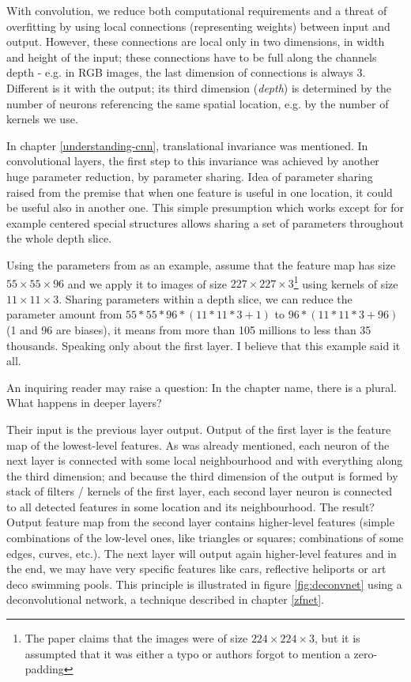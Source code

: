 With convolution, we reduce both computational requirements and a threat of 
overfitting by using local connections (representing weights) between input and 
output. However, these connections are local only in two dimensions, in width 
and height of the input; these connections have to be full along the channels 
depth - e.g. in RGB images, the last dimension of connections is always 3. 
Different is it with the output; its third dimension (\textit{depth}) is 
determined by the number of neurons referencing the same spatial location, e.g. 
by the number of kernels we use. 

In chapter \ref{understanding-cnn}, translational invariance was mentioned. In 
convolutional layers, the first step to this invariance was achieved by another 
huge parameter reduction, by parameter sharing. Idea of parameter sharing raised 
from the premise that when one feature is useful in one location, it could be 
useful also in another one. This simple presumption which works except for for 
example centered special structures allows sharing a set of parameters 
throughout the whole depth slice. 

Using the parameters from \cite{cnn-classification} as an example, assume that 
the feature map has size $55 \times 55 \times 96$ and we apply it to images of 
size $227 \times 227 \times 3$\footnote{The paper claims that the images were of 
size $224 \times 224 \times 3$, but it is assumpted that it was either a typo or 
authors forgot to mention a zero-padding} using kernels of size $11 \times 11 
\times 3$. Sharing parameters within a depth slice, we can reduce the parameter 
amount from $55 * 55 * 96 * (11 * 11 * 3 + 1)$ to $96 * (11 * 11 * 3 + 96)$ (1 
and 96 are biases), it means from more than 105 millions to less than 35 
thousands. Speaking only about the first layer. I believe that this example said 
it all. 

An inquiring reader may raise a question: In the chapter name, there is a 
plural. What happens in deeper layers? 

Their input is the previous layer output. Output of the first layer is the 
feature map of the lowest-level features. As was already mentioned, each neuron 
of the next layer is connected with some local neighbourhood and with everything 
along the third dimension; and because the third dimension of the output is 
formed by stack of filters / kernels of the first layer, each second layer 
neuron is connected to all detected features in some location and its 
neighbourhood. The result? Output feature map from the second layer contains 
higher-level features (simple combinations of the low-level ones, like triangles 
or squares; combinations of some edges, curves, etc.). The next layer 
will output again higher-level features and in the end, we may have very 
specific features like cars, reflective heliports or art deco swimming pools. 
This principle is illustrated in figure \ref{fig:deconvnet} using a 
deconvolutional network, a technique described in chapter \ref{zfnet}.

